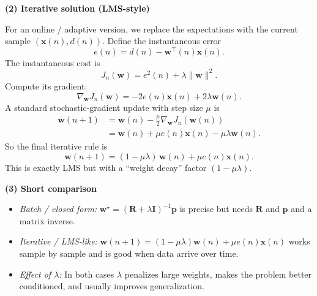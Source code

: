 \documentclass[11pt]{article}
\begin{document}
	\medskip
	\noindent\textbf{(2) Iterative solution (LMS-style)}
	
	For an online / adaptive version, we replace the expectations with the current sample $(\mathbf{x}(n), d(n))$. Define the instantaneous error
	\[
	e(n) = d(n) - \mathbf{w}^\top(n)\mathbf{x}(n).
	\]
	The instantaneous cost is
	\[
	J_n(\mathbf{w}) = e^2(n) + \lambda \lVert \mathbf{w} \rVert^2.
	\]
	Compute its gradient:
	\[
	\nabla_{\mathbf{w}} J_n(\mathbf{w}) = -2 e(n)\mathbf{x}(n) + 2 \lambda \mathbf{w}(n).
	\]
	A standard stochastic-gradient update with step size $\mu$ is
	\begin{align*}
		\mathbf{w}(n+1)
		&= \mathbf{w}(n) - \frac{\mu}{2} \nabla_{\mathbf{w}} J_n(\mathbf{w}(n)) \\
		&= \mathbf{w}(n) + \mu e(n)\mathbf{x}(n) - \mu \lambda \mathbf{w}(n).
	\end{align*}
	So the final iterative rule is
	\[
	\boxed{\mathbf{w}(n+1) = (1 - \mu \lambda)\,\mathbf{w}(n) + \mu e(n)\mathbf{x}(n).}
	\]
	This is exactly LMS but with a “weight decay” factor $(1 - \mu \lambda)$.
	
	\medskip
	\noindent\textbf{(3) Short comparison}
	
	\begin{itemize}
		\item \emph{Batch / closed form:} $\mathbf{w}^\star = (\mathbf{R} + \lambda \mathbf{I})^{-1} \mathbf{p}$ is precise but needs $\mathbf{R}$ and $\mathbf{p}$ and a matrix inverse.
		\item \emph{Iterative / LMS-like:} $\mathbf{w}(n+1) = (1 - \mu \lambda)\mathbf{w}(n) + \mu e(n)\mathbf{x}(n)$ works sample by sample and is good when data arrive over time.
		\item \emph{Effect of $\lambda$:} In both cases $\lambda$ penalizes large weights, makes the problem better conditioned, and usually improves generalization.
	\end{itemize}
	
\end{document}
